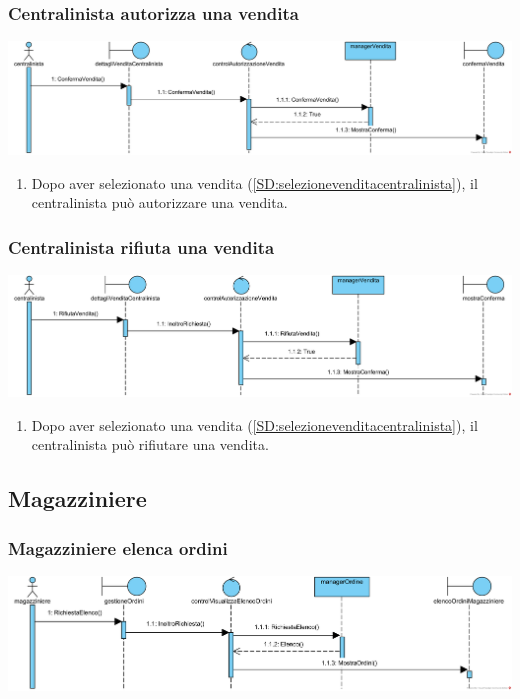 \documentclass[12pt,a4paper]{article}
\begin{document}
\subsubsection{Centralinista autorizza una vendita}
\label{SD:centralinistaautorizza}
\begin{center}
\includegraphics[width=\textwidth]{SequenceDiagram/CentralinistaVenditaAutorizza}
\end{center}

\begin{enumerate}
\item Dopo aver selezionato una vendita (\ref{SD:selezionevenditacentralinista}), il centralinista può autorizzare una vendita.
\end{enumerate}

\subsubsection{Centralinista rifiuta una vendita}
\label{SD:centralinistarifiuta}
\begin{center}
\includegraphics[width=\textwidth]{SequenceDiagram/CentralinistaVenditaRifiuta}
\end{center}

\begin{enumerate}
\item Dopo aver selezionato una vendita (\ref{SD:selezionevenditacentralinista}), il centralinista può rifiutare una vendita.
\end{enumerate}

\newpage

\subsection{Magazziniere}
\subsubsection{Magazziniere elenca ordini}
\label{SD:magazzinierevisualizzaelenco}
\begin{center}
\includegraphics[width=\textwidth]{SequenceDiagram/MagazziniereOrdiniElenco}
\end{center}
\end{document}
